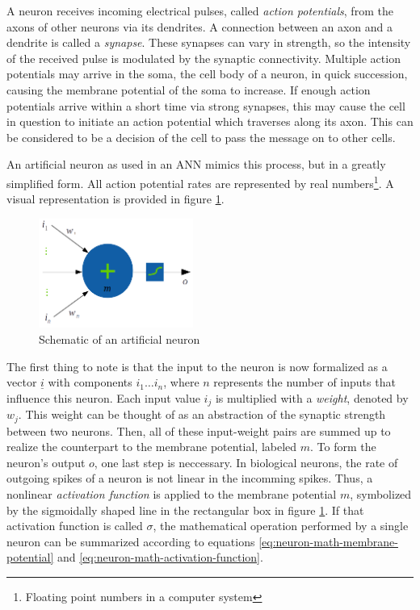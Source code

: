 \documentclass[11pt, a4paper]{article}
\renewcommand{\vec}[1]{\underline{#1}}
\begin{document}
A neuron receives incoming electrical pulses, called \emph{action potentials}, from the axons of other neurons via its dendrites. A connection between an axon and a dendrite is called a \emph{synapse}. These synapses can vary in strength, so the intensity of the received pulse is modulated by the synaptic connectivity. Multiple action potentials may arrive in the soma, the cell body of a neuron, in quick succession, causing the membrane potential of the soma to increase. If enough action potentials arrive within a short time via strong synapses, this may cause the cell in question to initiate an action potential which traverses along its axon. This can be considered to be a decision of the cell to pass the message on to other cells.

An artificial neuron as used in an ANN mimics this process, but in a greatly simplified form. All action potential rates are represented by real numbers\footnote{Floating point numbers in a computer system}. A visual representation is provided in figure \ref{fig:artificial-neuron-schematic}.


\begin{figure}[htp]
	\centering
	\includegraphics[width=0.45\textwidth]{images/artificial_neuron.png}
	\caption{Schematic of an artificial neuron}
	\label{fig:artificial-neuron-schematic}
\end{figure}

The first thing to note is that the input to the neuron is now formalized as a vector $\vec{i}$ with components $i_1 \dots i_n$, where $n$ represents the number of inputs that influence this neuron. Each input value $i_j$ is multiplied with a \emph{weight}, denoted by $w_j$. This weight can be thought of as an abstraction of the synaptic strength between two neurons. Then, all of these input-weight pairs are summed up to realize the counterpart to the membrane potential, labeled $m$. To form the neuron's output $o$, one last step is neccessary. In biological neurons, the rate of outgoing spikes of a neuron is not linear in the incomming spikes. Thus, a nonlinear \emph{activation function} is applied to the membrane potential $m$, symbolized by the sigmoidally shaped line in the rectangular box in figure \ref{fig:artificial-neuron-schematic}. If that activation function is called $\sigma$, the mathematical operation performed by a single neuron can be summarized according to equations \eqref{eq:neuron-math-membrane-potential} and \eqref{eq:neuron-math-activation-function}.
\end{document}
